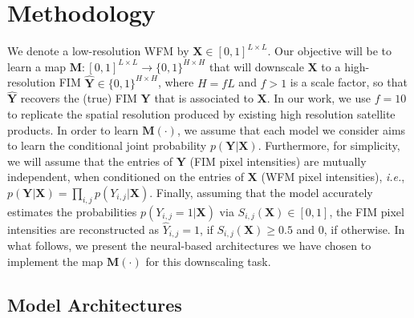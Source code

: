 

\section{Methodology}
\label{sec:Methodology}

We denote a low-resolution \ac{WFM} by $\mathbf{X} \in [0, 1]^{L \times L}$. Our objective will be to learn a map $\mathbf{M}: [0, 1]^{L \times L} \to \{0, 1\}^{H \times H}$ that will downscale $\mathbf{X}$ to a high-resolution \ac{FIM} $\hat{\mathbf{Y}} \in \{0, 1\}^{H \times H}$, where $H = fL$ and $f > 1$ is a scale factor, so that $\hat{\mathbf{Y}}$ recovers the (true) \ac{FIM} $\mathbf{Y}$ that is associated to $\mathbf{X}$. In our work, we use $f=10$ to replicate the spatial resolution produced by existing high resolution satellite products. In order to learn $\mathbf{M}(\cdot)$, we assume that each model we consider aims to learn the conditional joint probability $p(\mathbf{Y} | \mathbf{X})$. Furthermore, for simplicity, we will assume that the entries of $\mathbf{Y}$ (\ac{FIM} pixel intensities) are mutually independent, when conditioned on the entries of $\mathbf{X}$ (\ac{WFM} pixel intensities), \textit{i.e.}, $p(\mathbf{Y} | \mathbf{X}) = \prod_{i,j} p(Y_{i,j} | \mathbf{X})$. Finally, assuming that the model accurately estimates the probabilities $p(Y_{i,j} = 1 | \mathbf{X})$ via $S_{i,j}(\mathbf{X}) \in [0,1]$, the \ac{FIM} pixel intensities are reconstructed as $\hat{Y}_{i,j} = 1$, if $S_{i,j}(\mathbf{X}) \geq 0.5$ and $0$, if otherwise. In what follows, we present the neural-based architectures we have chosen to implement the map $\mathbf{M}(\cdot)$ for this downscaling task.



\subsection{Model Architectures}
\label{subsec:ModelArchitecture}

